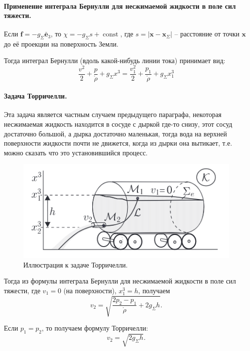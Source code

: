 \paragraph{Применение интеграла Бернулли для несжимаемой жидкости в поле сил тяжести.}
Если $\mathbf{f} = - g_\Sigma \bar{\mathbf{e}}_3$, то $\chi = - g_\Sigma s + \operatorname{const}$,
где $s = |\mathbf{x} - \mathbf{x}_\Sigma|$ -- расстояние от точки $\mathbf{x}$ до её проекции
на поверхность Земли.

Тогда интеграл Бернулли (вдоль какой-нибудь линии тока) принимает вид:
\[
  \dfrac{v^2}{2} + \dfrac{p}{\mathring{\rho}} + g_\Sigma x^3 = \dfrac{v_1^2}{2} + \dfrac{p_1}{\mathring{\rho}} + g_\Sigma x_1^3
\]

\paragraph{Задача Торричелли.} Эта задача является частным случаем предыдущего параграфа,
некоторая несжимаемая жидкость находится в сосуде с дыркой где-то снизу, этот сосуд достаточно
большой, а дырка достаточно маленькая, тогда вода на верхней поверхности жидкости почти не
движется, когда из дырки она вытикает, т.е. можно сказать что это установившийся процесс.
\begin{figure}[H]
  \centering
  \includegraphics[width=0.9\linewidth]{img/torrichelli.png}
  \caption{Иллюстрация к задаче Торричелли.}
\end{figure}

Тогда из формулы интеграла Бернулли для несжимаемой жидкости в поле сил тяжести, где $v_1 = 0$
(на поверхности), $x^3_1 = h$, получаем
\[
  v_2 = \sqrt{ \dfrac{2p_2 - p_1}{\mathring{\rho}} + 2 g_\Sigma h }.
\]

Если $p_1 = p_2$, то получаем формулу Торричелли:
\[
  v_2 = \sqrt{2 g_\Sigma h}.
\]
